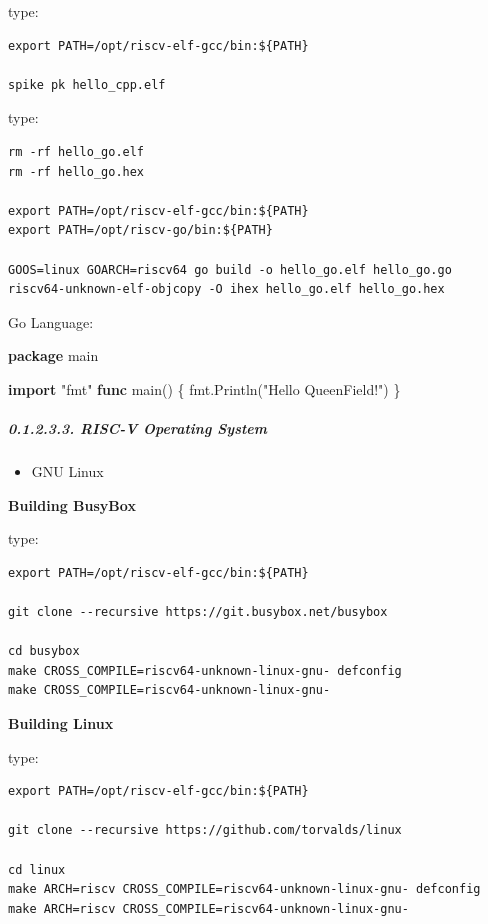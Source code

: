\documentclass[
]{article}
\newenvironment{Shaded}{}{}
\newcommand{\KeywordTok}[1]{\textcolor[rgb]{0.00,0.44,0.13}{\textbf{#1}}}
\newcommand{\NormalTok}[1]{#1}
\newcommand{\StringTok}[1]{\textcolor[rgb]{0.25,0.44,0.63}{#1}}
\providecommand{\tightlist}{%
  \setlength{\itemsep}{0pt}\setlength{\parskip}{0pt}}
\begin{document}
type:

\begin{verbatim}
export PATH=/opt/riscv-elf-gcc/bin:${PATH}

spike pk hello_cpp.elf
\end{verbatim}

type:

\begin{verbatim}
rm -rf hello_go.elf
rm -rf hello_go.hex

export PATH=/opt/riscv-elf-gcc/bin:${PATH}
export PATH=/opt/riscv-go/bin:${PATH}

GOOS=linux GOARCH=riscv64 go build -o hello_go.elf hello_go.go
riscv64-unknown-elf-objcopy -O ihex hello_go.elf hello_go.hex
\end{verbatim}

Go Language:

\begin{Shaded}
\begin{Highlighting}[]
\KeywordTok{package}\NormalTok{ main}

\KeywordTok{import} \StringTok{"fmt"}
\KeywordTok{func}\NormalTok{ main() \{}
\NormalTok{  fmt.Println(}\StringTok{"Hello QueenField!"}\NormalTok{)}
\NormalTok{\}}
\end{Highlighting}
\end{Shaded}

\hypertarget{risc-v-operating-system-1}{%
\subparagraph{0.1.2.3.3. RISC-V Operating
System}\label{risc-v-operating-system-1}}

\begin{itemize}
\tightlist
\item
  GNU Linux
\end{itemize}

\textbf{Building BusyBox}

type:

\begin{verbatim}
export PATH=/opt/riscv-elf-gcc/bin:${PATH}

git clone --recursive https://git.busybox.net/busybox

cd busybox
make CROSS_COMPILE=riscv64-unknown-linux-gnu- defconfig
make CROSS_COMPILE=riscv64-unknown-linux-gnu-
\end{verbatim}

\textbf{Building Linux}

type:

\begin{verbatim}
export PATH=/opt/riscv-elf-gcc/bin:${PATH}

git clone --recursive https://github.com/torvalds/linux

cd linux
make ARCH=riscv CROSS_COMPILE=riscv64-unknown-linux-gnu- defconfig
make ARCH=riscv CROSS_COMPILE=riscv64-unknown-linux-gnu-
\end{verbatim}
\end{document}
